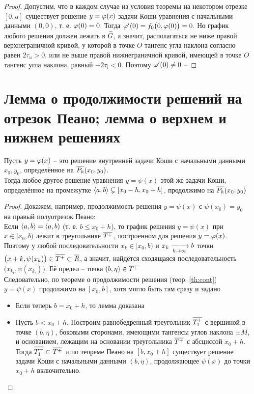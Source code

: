 \begin{proof}
    Допустим, что в каждом случае из условия теоремы на некотором отрезке $ [0, a] $ существует решение $ y = \varphi(x) $ задачи Коши уравнения  с начальными данными $ (0, 0) $, т. е. $ \varphi(0) = 0 $. Тогда $ \varphi'(0) = f_0 \big( 0, \varphi(0) \big) = 0 $. Но график любого решения должен лежать в $ \widetilde{G} $, а значит, располагаться не ниже правой верхнеграничной кривой, у которой в точке $ O $ тангенс угла наклона согласно  равен $ 2\tau_u > 0 $, или не выше правой нижнеграничной кривой, имеющей в точке $ O $ тангенс угла наклона, равный $ -2\tau_l < 0 $. Поэтому $ \varphi'(0) \ne 0 $ -- \contra
\end{proof}

\section{Лемма о продолжимости решений на отрезок Пеано; лемма о верхнем и нижнем решениях}

\begin{lemma}
    Пусть $ y = \varphi(x) $ -- это решение внутренней задачи Коши с начальными данными $ x_0, y_0 $, определённое на $ \overline{P_h}(x_0, y_0) $. \\
    Тогда любое другое решение уравнения  $ y = \psi(x) $ этой же задачи Коши, определённое на промежутке $ \Braket{a, b} \subsetneq [x_0 - h, x_0 + h] $, продолжимо на $ \overline{P_h}(x_0, y_0) $
\end{lemma}

\begin{proof}
	Докажем, например, продолжимость решения $ y = \psi(x) $ с $ \psi(x_0) = y_0 $ на правый полуотрезок Пеано: \\
    Если $ \Braket{a, b} = \langle a, b) $ (т. е. $ b \le x_0 + h $), то график решения $ y = \psi(x) $ при $ x \in [x_0, b) $ лежит в треугольнике $ \overline{T^+} $, построенном для решения $ y = \varphi(x) $. Поэтому у любой последовательности $ x_k \in [x_0, b) $ и $ x_k \xrightarrow[{k} \to {\infty}]{} b $ точки $ \big( x+k, \psi(x_k) \big) \in \overline{T^+} \subset \overline{R} $, а значит, найдётся сходящаяся последовательность $ \big( x_{k_l}, \psi(x_{k_l}) \big) $. Её предел -- точка $ (b, \eta) \in \overline{T^+} $ \\
    Следовательно, по теореме о продолжимости решения (теор. \ref{th:cont}) $ y = \psi(x) $ продолжимо на $ [x_0, b] $, хотя могло быть там сразу и задано
    \begin{itemize}
        \item Если теперь $ b = x_0 + h $, то лемма доказана
        \item Пусть $ b < x_0 + h $. Построим равнобедренный треугольник $ \overline{T_1^+} $ с вершиной в точке $ (b, \eta) $, боковыми сторонами, имеющими тангенсы углов наклона $ \pm M $, и основанием, лежащим на основании треугольника $ \overline{T^+} $ с абсциссой $ x_0 + h $. Тогда $ \overline{T_1^+} \subset \overline{T^+} $ и по теореме Пеано на $ [b, x_0 + h] $ существует решение задачи Коши с начальными данными $ (b, \eta) $, продолжающее $ \psi(x) $ до точки $ x_0 + h $ включительно.
    \end{itemize}
\end{proof}

